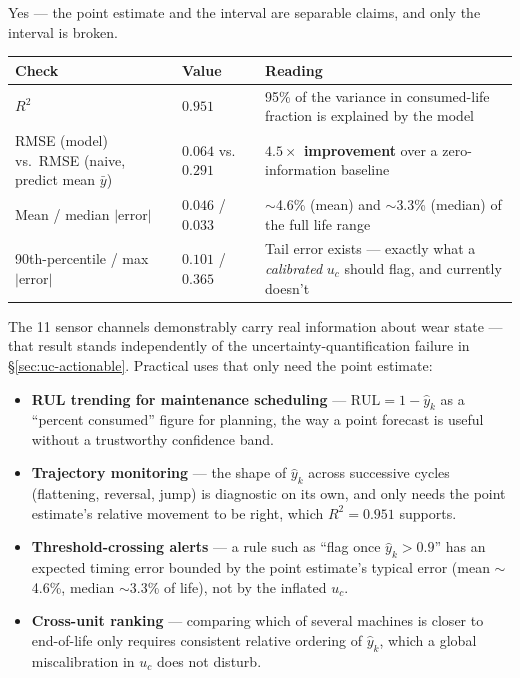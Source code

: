 \documentclass[11pt]{article}
\newcommand{\Rul}{\text{RUL}}
\begin{document}
Yes --- the point estimate and the interval are separable claims, and only
the interval is broken.

\begin{center}
\begin{tabular}{@{}p{5.6cm}p{3.0cm}p{5.9cm}@{}}
\toprule
Check & Value & Reading \\
\midrule
$R^2$ & $0.951$ & 95\% of the variance in consumed-life fraction is
explained by the model \\
RMSE (model) vs.\ RMSE (naive, predict mean $\bar y$) & $0.064$ vs.\ $0.291$
& \textbf{$4.5\times$ improvement} over a zero-information baseline \\
Mean / median $\lvert\text{error}\rvert$ & $0.046$ / $0.033$ & $\sim$4.6\% (mean) and
$\sim$3.3\% (median) of the full life range \\
90th-percentile / max $\lvert\text{error}\rvert$ & $0.101$ / $0.365$ & Tail
error exists --- exactly what a \emph{calibrated} $u_c$ should flag, and
currently doesn't \\
\bottomrule
\end{tabular}
\end{center}

The 11 sensor channels demonstrably carry real information about wear state
--- that result stands independently of the uncertainty-quantification
failure in \S\ref{sec:uc-actionable}. Practical uses that only need the
point estimate:

\begin{itemize}
\item \textbf{RUL trending for maintenance scheduling} --- $\Rul=1-\hat
y_k$ as a ``percent consumed'' figure for planning, the way a point
forecast is useful without a trustworthy confidence band.
\item \textbf{Trajectory monitoring} --- the shape of $\hat y_k$ across
successive cycles (flattening, reversal, jump) is diagnostic on its own,
and only needs the point estimate's relative movement to be right, which
$R^2=0.951$ supports.
\item \textbf{Threshold-crossing alerts} --- a rule such as ``flag once
$\hat y_k>0.9$'' has an expected timing error bounded by the point
estimate's typical error (mean $\sim$4.6\%, median $\sim$3.3\% of life), not by the inflated $u_c$.
\item \textbf{Cross-unit ranking} --- comparing which of several machines
is closer to end-of-life only requires consistent relative ordering of
$\hat y_k$, which a global miscalibration in $u_c$ does not disturb.
\end{itemize}
\end{document}
